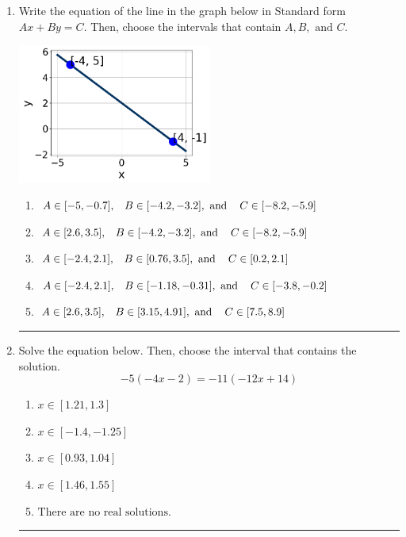 \documentclass[14pt]{extbook}
\newcommand{\litem}[1]{\item#1\hspace*{-1cm}\rule{\textwidth}{0.4pt}}
\begin{document}
\begin{enumerate}
{\begin{enumerate}[label=\Alph*.]
\end{enumerate} }
\litem{
Write the equation of the line in the graph below in Standard form $Ax+By=C$. Then, choose the intervals that contain $A, B, \text{ and } C$.
\begin{center}
    \includegraphics[width=0.5\textwidth]{../Figures/linearGraphToStandardCopyB.png}
\end{center}
\begin{enumerate}[label=\Alph*.]
\item \( A \in [-5, -0.7], \hspace{3mm} B \in [-4.2, -3.2], \text{ and } \hspace{3mm} C \in [-8.2, -5.9] \)
\item \( A \in [2.6, 3.5], \hspace{3mm} B \in [-4.2, -3.2], \text{ and } \hspace{3mm} C \in [-8.2, -5.9] \)
\item \( A \in [-2.4, 2.1], \hspace{3mm} B \in [0.76, 3.5], \text{ and } \hspace{3mm} C \in [0.2, 2.1] \)
\item \( A \in [-2.4, 2.1], \hspace{3mm} B \in [-1.18, -0.31], \text{ and } \hspace{3mm} C \in [-3.8, -0.2] \)
\item \( A \in [2.6, 3.5], \hspace{3mm} B \in [3.15, 4.91], \text{ and } \hspace{3mm} C \in [7.5, 8.9] \)

\end{enumerate} }
\litem{
Solve the equation below. Then, choose the interval that contains the solution.\[ -5(-4x -2) = -11(-12x + 14) \]\begin{enumerate}[label=\Alph*.]
\item \( x \in [1.21, 1.3] \)
\item \( x \in [-1.4, -1.25] \)
\item \( x \in [0.93, 1.04] \)
\item \( x \in [1.46, 1.55] \)
\item \( \text{There are no real solutions.} \)


\end{enumerate}}
\end{enumerate}
\end{document}
